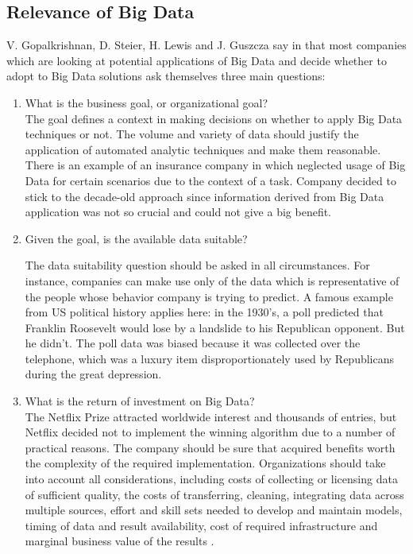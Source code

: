 \documentclass[runningheads]{llncs}
\begin{document}
\subsection{Relevance of Big Data}
V. Gopalkrishnan, D. Steier, H. Lewis and J. Guszcza say in \cite{Gopalkrishnan} that most companies which are looking at potential applications of Big Data and decide whether to adopt to Big Data solutions ask themselves three main questions:
\begin{enumerate}
\item What is the business goal, or organizational goal?\\

The goal defines a context in making decisions on whether to apply Big Data techniques or not. The volume and variety of data should justify the application of automated analytic techniques and make them reasonable. There is an example of an insurance company in \cite{Gopalkrishnan} which neglected usage of Big Data for certain scenarios due to the context of a task. Company decided to stick to the decade-old approach since information derived from Big Data application was not so crucial and could not give a big benefit.\\ 
\item Given the goal, is the available data suitable? 

The data suitability question should be asked in all circumstances. For instance, companies can make use only of the data which is representative of the people whose behavior company is trying to predict. A famous example from US political history applies here: in the 1930's, a poll predicted that Franklin Roosevelt would lose by a landslide to his Republican opponent. But he didn't. The poll data was biased because it was collected over the telephone, which was a luxury item disproportionately used by Republicans during the great depression.\\

\item What is the return of investment on Big Data?\\

The Netflix Prize attracted worldwide interest and thousands of entries, but Netflix decided not to implement the winning algorithm \cite{NETFLIX} due to a number of practical reasons. The company should be sure that acquired benefits worth the complexity of the required implementation. Organizations should take into account all considerations, including costs of collecting or licensing data of sufficient quality, the costs of transferring, cleaning, integrating data across multiple sources, effort and skill sets needed to develop and maintain models, timing of data and result availability, cost of required infrastructure and marginal business value of the results \cite{Gopalkrishnan}.
\end{enumerate}
\end{document}
